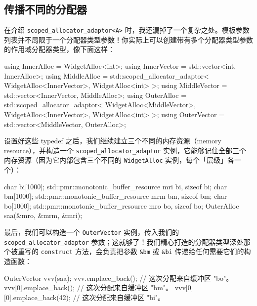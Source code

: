 \subsection{传播不同的分配器}

在介绍 \texttt{scoped\_\allowbreak{}allocator\_\allowbreak{}adaptor<\allowbreak{}A>\allowbreak{}} 时，我还漏掉了一个复杂之处。模板参数列表并不局限于一个分配器类型参数！你实际上可以创建带有多个分配器类型参数的作用域分配器类型，像下面这样：

\begin{codebox}[cpp]
    using InnerAlloc = WidgetAlloc<int>;
    using InnerVector = std::vector<int, InnerAlloc>;
    using MiddleAlloc = std::scoped_allocator_adaptor<
      WidgetAlloc<InnerVector>,
      WidgetAlloc<int>
    >;
    using MiddleVector = std::vector<InnerVector, MiddleAlloc>;
    using OuterAlloc = std::scoped_allocator_adaptor<
      WidgetAlloc<MiddleVector>,
      WidgetAlloc<InnerVector>,
      WidgetAlloc<int>
    >;
    using OuterVector = std::vector<MiddleVector, OuterAlloc>;
\end{codebox}

设置好这些 typedef 之后，我们继续建立三个不同的内存资源（memory resource），并构造一个 \texttt{scoped\_\allowbreak{}allocator\_\allowbreak{}adaptor} 实例，它能够记住全部三个内存资源（因为它内部包含三个不同的 \texttt{Widget\allowbreak{}Alloc} 实例，每个「层级」各一个）：

\begin{codebox}[cpp]
    char bi[1000];
    std::pmr::monotonic_buffer_resource mri {bi, sizeof bi};
    char bm[1000];
    std::pmr::monotonic_buffer_resource mrm {bm, sizeof bm};
    char bo[1000];
    std::pmr::monotonic_buffer_resource mro {bo, sizeof bo};
    OuterAlloc saa(&mro, &mrm, &mri);
\end{codebox}

最后，我们可以构造一个 \texttt{Outer\allowbreak{}Vector} 实例，传入我们的 \texttt{scoped\_\allowbreak{}allocator\_\allowbreak{}adaptor} 参数；这就够了！我们精心打造的分配器类型深处那个被重写的 \texttt{construct} 方法，会负责把参数 \texttt{\&bm} 或 \texttt{\&bi} 传递给任何需要它们的构造函数：

\begin{codebox}[cpp]
    OuterVector vvv(saa);
    vvv.emplace_back();
      // 这次分配来自缓冲区 "bo"。
    vvv[0].emplace_back();
      // 这次分配来自缓冲区 "bm"。
    vvv[0][0].emplace_back(42);
      // 这次分配来自缓冲区 "bi"。
\end{codebox}

